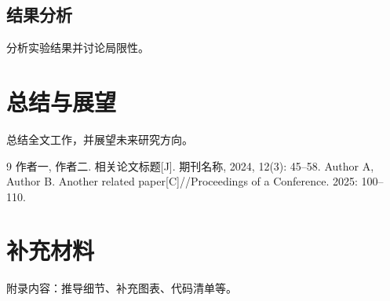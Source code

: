 \documentclass[zihao=-4, a4paper, oneside]{ctexbook}
\begin{document}
\section{结果分析}
分析实验结果并讨论局限性。

\chapter{总结与展望}
总结全文工作，并展望未来研究方向。

\backmatter
\begin{thebibliography}{9}
作者一, 作者二. 相关论文标题[J]. 期刊名称, 2024, 12(3): 45--58.
Author A, Author B. Another related paper[C]//Proceedings of a Conference.
2025: 100--110.
\end{thebibliography}

\appendix
\chapter{补充材料}
附录内容：推导细节、补充图表、代码清单等。
\end{document}
